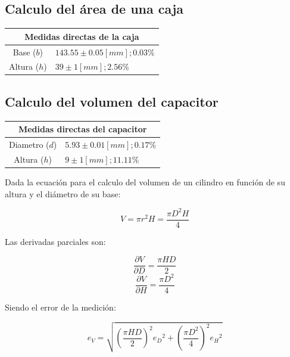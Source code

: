 \documentclass[letter,11pt]{article}
\begin{document}
\subsection{Calculo del área de una caja}
\begin{center}
\begin{tabular}{|c|>{\centering}m{5.0cm}<{\centering}|}
\hline
\multicolumn{2}{|c|}{\textbf{Medidas directas de la caja}}
\tabularnewline \hline
  Base ($b$) & $143.55 \pm 0.05 [mm]; 0.03\%$ \tabularnewline \hline
Altura ($h$) & $ 39    \pm 1    [mm]; 2.56\%$ \tabularnewline \hline
\end{tabular}
\end{center}

\subsection{Calculo del volumen del capacitor}
\begin{center}
\begin{tabular}{|c|>{\centering}m{5.0cm}<{\centering}|}
\hline
\multicolumn{2}{|c|}{\textbf{Medidas directas del capacitor}}
\tabularnewline \hline
Diametro ($d$) & $5.93 \pm 0.01 [mm];  0.17\%$ \tabularnewline \hline
  Altura ($h$) & $9    \pm 1    [mm]; 11.11\%$ \tabularnewline \hline
\end{tabular}
\end{center}

Dada la ecuación para el calculo del volumen de un cilindro en función de su
altura y el diámetro de su base:

\begin{equation}
    V = \pi r^2 H = \frac{\pi D^2 H}{4}
\end{equation}

Las derivadas parciales son:

\begin{equation}
    \frac{\partial{V}}{\partial{D}} = \frac{\pi H D}{2}
\end{equation}
\begin{equation}
    \frac{\partial{V}}{\partial{H}} = \frac{\pi D^2}{4}
\end{equation}

Siendo el error de la medición:

\begin{equation}
    e_V = \sqrt{
        \left(\frac{\pi H D}{2}\right)^2 {e_D}^2 +
        \left(\frac{\pi D^2}{4}\right)^2 {e_H}^2
    }
\end{equation}
\end{document}
